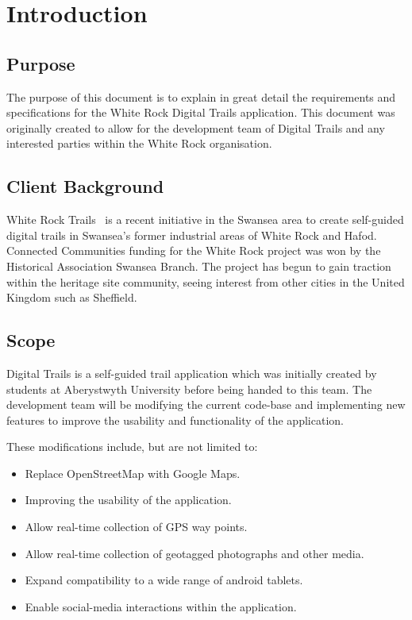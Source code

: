\documentclass[11pt,a4paper]{article}
\begin{document}


\newpage 

\tableofcontents

\newpage
\section{Introduction}
\subsection{Purpose}
\label{sec:purpose}
The purpose of this document is to explain in great detail the requirements and specifications for the White Rock Digital Trails application. This document was originally created to allow for the development team of Digital Trails and any interested parties within the White Rock organisation.

\subsection{Client Background}
\label{sec:client-background}
White Rock Trails~\cite{whiterock} is a recent initiative in the Swansea area to create self-guided digital trails in Swansea's former industrial areas of White Rock and Hafod. Connected Communities funding for the White Rock project was won by the Historical Association Swansea Branch. The project has begun to gain traction within the heritage site community, seeing interest from other cities in the United Kingdom such as Sheffield.

\subsection{Scope}
\label{sec:scope}
Digital Trails is a self-guided trail application which was initially created by students at Aberystwyth University before being handed to this team. The development team will be modifying the current code-base and implementing new features to improve the usability and functionality of the application.

These modifications include, but are not limited to:
\begin{itemize}
\item Replace OpenStreetMap with Google Maps.
\item Improving the usability of the application.
\item Allow real-time collection of GPS way points.
\item Allow real-time collection of geotagged photographs and other media.
\item Expand compatibility to a wide range of android tablets.
\item Enable social-media interactions within the application.
\end{itemize}
\end{document}

